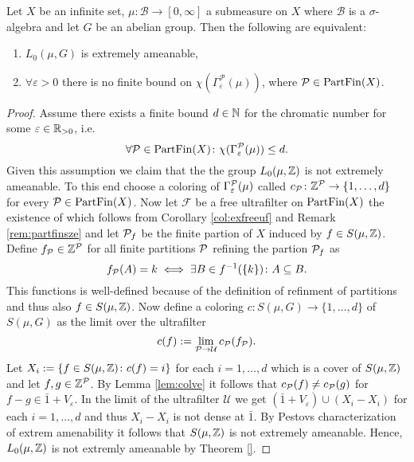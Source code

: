 \begin{lemma}
  Let $X$ be an infinite set, $\mu\colon \mathcal{B} \to [0, \infty]$ a submeasure on $X$ where $\mathcal{B}$ is a $\sigma$-algebra and let $G$ be an abelian group. Then the following are equivalent:
  \begin{enumerate}
    \item $L_0(\mu, G)$ is extremely ameanable,
    \item $\forall \varepsilon > 0$ there is no finite bound on $\chi(\Gamma_{\varepsilon}^{\mathcal{P}}(\mu))$, where $\mathcal{P} \in {\rm PartFin}(X)$.
  \end{enumerate}
\end{lemma}

\begin{proof}
  Assume there exists a finite bound $d \in \N$ for the chromatic number for some $\varepsilon \in \R_{>0}$, i.e.
  \begin{equation*}
    \forall \P \in {\rm PartFin}(X)\colon \chi(\Gamma_\varepsilon^{\P}(\mu)) \leq d. 
  \end{equation*}
  Given this assumption we claim that the the group $L_0(\mu, \Z)$ is not extremely ameanable. To this end choose a coloring of $\Gamma_{\varepsilon}^{\P}(\mu)$ called $c_{\P}\colon \Z^{\P} \to \{1, \ldots, d\}$ for every $\P \in {\rm PartFin}(X)$. Now let $\mathcal{F}$ be a free ultrafilter on ${\rm PartFin}(X)$ the existence of which follows from Corollary \ref{col:exfreeuf} and Remark \ref{rem:partfinsze} and let $\P_f$ be the finite partion of $X$ induced by $f \in S(\mu, \Z)$. Define $f_\P \in \Z^\P$ for all finite partitions $\P$ refining the partion $\P_f$ as
  \begin{equation*}
    f_\P(A) = k \iff \exists B \in f^{-1}(\{k\})\colon A \subseteq B. 
  \end{equation*}
  This functions is well-defined because of the definition of refinment of partitions and thus also $f \in S(\mu, \Z)$.
  Now define a coloring $c: S(\mu, G) \to \{1, \ldots, d\}$ of $S(\mu, G)$ as the limit over the ultrafilter
  \begin{equation*}
    c(f) := \lim\limits_{\P \to \mathcal{U}} c_{\P}(f_\P).
  \end{equation*}
  Let $X_i := \{f \in S(\mu, \Z)\colon c(f) = i\}$ for each $i = 1, \ldots, d$ which is a cover of $S(\mu, \Z)$ and let $f, g \in \Z^\P$. By Lemma \ref{lem:colve} it follows that $c_\P(f) \neq c_\P(g)$ for $f - g \in \bar{1} + V_\varepsilon$.
  In the limit of the ultrafilter $\mathcal{U}$ we get $(\bar{1} + V_\varepsilon) \cup (X_i - X_i)$ for each $i = 1, \ldots, d$ and thus $X_i - X_i$ is not dense at $\bar{1}$. By Pestovs characterization of extrem amenability it follows that $S(\mu, \Z)$ is not extremely ameanable. Hence, $L_0(\mu, \Z)$ is not extremly ameanable by Theorem \ref{}. 
\end{proof}
